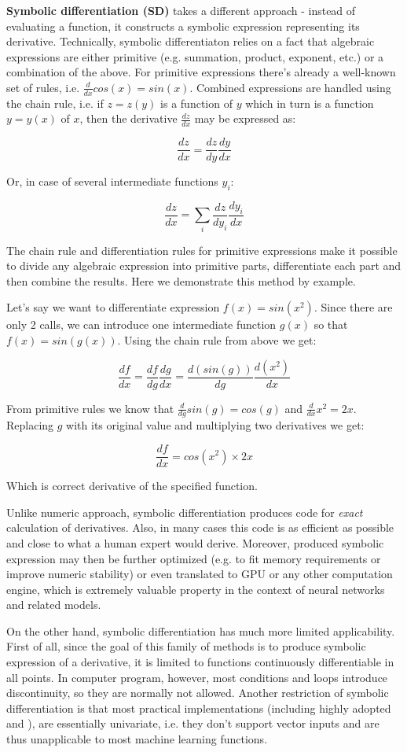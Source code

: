 \documentclass[conference]{IEEEtran}
\begin{document}
\textbf{Symbolic differentiation (SD)} takes a different approach -
instead of evaluating a function, it constructs a symbolic expression
representing its derivative. Technically, symbolic differentiaton
relies on a fact that algebraic expressions are either primitive
(e.g. summation, product, exponent, etc.) or a combination of the
above. For primitive expressions there's already a well-known set of
rules, i.e. $\frac{d}{dx}cos(x) = sin(x)$. Combined expressions are
handled using the chain rule, i.e. if $z = z(y)$ is a function of $y$
which in turn is a function $y = y(x)$ of $x$, then the derivative
$\frac{dz}{dx}$ may be expressed as:

$$\frac{dz}{dx} = \frac{dz}{dy}\frac{dy}{dx}$$

Or, in case of several intermediate functions $y_i$:

$$\frac{dz}{dx} = \sum_i \frac{dz}{dy_i}\frac{dy_i}{dx}$$

The chain rule and differentiation rules for primitive expressions
make it possible to divide any algebraic expression into primitive
parts, differentiate each part and then combine the results. Here we
demonstrate this method by example.

Let's say we want to differentiate expression $f(x) = sin(x^2)$. Since
there are only 2 calls, we can introduce one intermediate function
$g(x)$ so that $f(x) = sin(g(x))$. Using the chain rule from above we
get:

$$\frac{df}{dx} = \frac{df}{dg}\frac{dg}{dx} = \frac{d(sin(g))}{dg}\frac{d(x^2)}{dx}$$

From primitive rules we know that $\frac{d}{dg}sin(g) = cos(g)$ and
$\frac{d}{dx}x^2 = 2x$. Replacing $g$ with its original value and
multiplying two derivatives we get:

$$\frac{df}{dx} = cos(x^2) \times 2x$$

Which is correct derivative of the specified function.

Unlike numeric approach, symbolic differentiation produces code for
\textit{exact} calculation of derivatives. Also, in many cases this
code is as efficient as possible and close to what a human expert
would derive. Moreover, produced symbolic expression may then be
further optimized (e.g. to fit memory requirements or improve numeric
stability) or even translated to GPU or any other computation engine,
which is extremely valuable property in the context of neural networks
and related models.

On the other hand, symbolic differentiation has much more limited
applicability. First of all, since the goal of this family of methods
is to produce symbolic expression of a derivative, it is limited to
functions continuously differentiable in all points. In computer
program, however, most conditions and loops introduce discontinuity,
so they are normally not allowed. Another restriction of symbolic
differentiation is that most practical implementations (including
highly adopted \cite{Mathematica} and \cite{SymPy}), are essentially
univariate, i.e. they don't support vector inputs and are thus
unapplicable to most machine learning functions.
\end{document}
